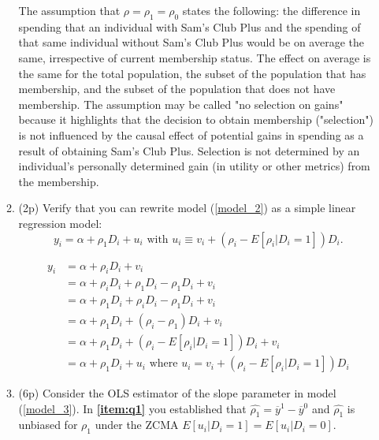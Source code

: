 \documentclass{article}
\begin{document}
\begin{enumerate}[label=\textbf{Q\arabic{enumi}}.,ref=Q\arabic{enumi}, wide=0pt, itemsep=1em, topsep=5pt]
\begin{enumerate}
\begin{solution}
{            The assumption that $\rho = \rho_1 = \rho_0$ states the following: the difference in spending that an individual with Sam's Club Plus and the spending of that same individual without Sam's Club Plus would be on average the same, irrespective of current membership status. The effect on average is the same for the total population, the subset of the population that has membership, and the subset of the population that does not have membership. The assumption may be called "no selection on gains" because it highlights that the decision to obtain membership ("selection") is not influenced by the causal effect of potential gains in spending as a result of obtaining Sam's Club Plus. Selection is not determined by an individual’s personally determined gain (in utility or other metrics) from the membership.
        }
        \end{solution}
        \item (2p) Verify that you can rewrite model (\ref{model_2}) as a simple linear regression model:
        \begin{equation}\label{model_3}
            y_{i}=\alpha +\rho_1 D_{i}+u_{i} \text{ with } u_i \equiv v_i+(\rho_i-E[\rho_i|D_i=1])D_i.
        \end{equation}
        \begin{solution}
            {
                \begin{align*}
                y_{i}&=\alpha +\rho _{i}D_{i}+v_{i} \\
                     &=\alpha +\rho _{i}D_{i} +\rho_1D_i - \rho_1D_i + v_i \\
                     &=\alpha +\rho_1D_i +\rho _{i}D_{i} - \rho_1D_i + v_i \\
                     &=\alpha +\rho_1D_i +(\rho_i - \rho_1)D_{i} + v_i \\
                     &=\alpha +\rho_1D_i +(\rho_i - E\left[ \rho _{i}|D_{i}=1\right])D_{i} + v_i \\
                     &=\alpha +\rho_1D_i + u_i \text{ where } u_i = v_i+(\rho_i-E[\rho_i|D_i=1])D_i
                \end{align*}
            }
        \end{solution}
        \item (6p) Consider the OLS estimator of the slope parameter in model (\ref{model_3}). In \textbf{\ref{item:q1}} you established that $\widehat{\rho_1 }=\overline{y}^{1}-\overline{y}^{0}$ and $\widehat{\rho_1 }$ is unbiased for $\rho_1$ under the ZCMA $E[u_i|D_i=1]=E[u_i|D_i=0]$.

\end{enumerate}
\end{enumerate}
\end{document}
